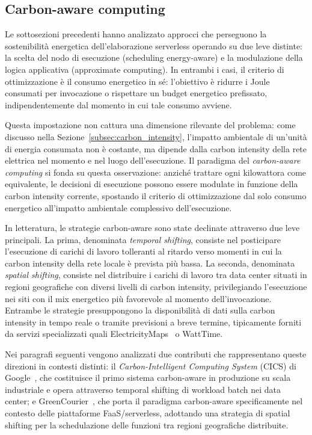 \subsection{Carbon-aware computing}
\label{subsec:carbon_aware_computing}

Le sottosezioni precedenti hanno analizzato approcci che perseguono la
sostenibilità energetica dell'elaborazione serverless operando su due
leve distinte: la scelta del nodo di esecuzione (scheduling
energy-aware) e la modulazione della logica applicativa (approximate
computing). In entrambi i casi, il criterio di ottimizzazione è il
consumo energetico in sé: l'obiettivo è ridurre i Joule consumati per
invocazione o rispettare un budget energetico prefissato,
indipendentemente dal momento in cui tale consumo avviene.

Questa impostazione non cattura una dimensione rilevante del problema:
come discusso nella Sezione~\ref{subsec:carbon_intensity}, l'impatto
ambientale di un'unità di energia consumata non è costante, ma dipende
dalla carbon intensity della rete elettrica nel momento e nel luogo
dell'esecuzione. Il paradigma del \emph{carbon-aware computing} si
fonda su questa osservazione: anziché trattare ogni kilowattora come
equivalente, le decisioni di esecuzione possono essere modulate in
funzione della carbon intensity corrente, spostando il criterio di
ottimizzazione dal solo consumo energetico all'impatto ambientale
complessivo dell'esecuzione.

In letteratura, le strategie carbon-aware sono state declinate
attraverso due leve principali. La prima, denominata \emph{temporal
shifting}, consiste nel posticipare l'esecuzione di carichi di lavoro
tolleranti al ritardo verso momenti in cui la carbon intensity della
rete locale è prevista più bassa. La seconda, denominata \emph{spatial
shifting}, consiste nel distribuire i carichi di lavoro tra data center
situati in regioni geografiche con diversi livelli di carbon intensity,
privilegiando l'esecuzione nei siti con il mix energetico più
favorevole al momento dell'invocazione. Entrambe le strategie
presuppongono la disponibilità di dati sulla carbon intensity in tempo
reale o tramite previsioni a breve termine, tipicamente forniti da
servizi specializzati quali ElectricityMaps~\cite{electricitymaps2024}
o WattTime.

Nei paragrafi seguenti vengono analizzati due contributi che
rappresentano queste direzioni in contesti distinti: il
\emph{Carbon-Intelligent Computing System} (CICS) di
Google~\cite{radovanovic2022carbon}, che costituisce il primo sistema
carbon-aware in produzione su scala industriale e opera attraverso
temporal shifting di workload batch nei data center; e
GreenCourier~\cite{greencourier}, che porta il paradigma carbon-aware
specificamente nel contesto delle piattaforme FaaS/serverless,
adottando una strategia di spatial shifting per la schedulazione delle
funzioni tra regioni geografiche distribuite.


